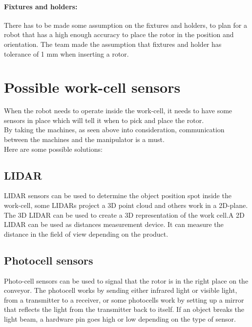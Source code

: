 \paragraph{Fixtures and holders:} There has to be made some assumption on the fixtures and holders, to plan for a robot that has a high enough accuracy to place the rotor in the position and orientation. The team made the assumption that fixtures and holder has tolerance of 1 mm when inserting a rotor. 

 
 \section{Possible work-cell sensors}\label{ref:PlacementS}
 
 When the robot needs to operate inside the work-cell, it needs to have some sensors in place which will tell it when to pick and place the rotor.\\
 By taking the machines, as seen above into consideration, communication between the machines and the manipulator is a must.\\
 Here are some possible solutions:\\

 
  \subsection{LIDAR} 
  LIDAR sensors can be used to determine the object position spot inside the work-cell, some LIDARs project a 3D point cloud and others work in a 2D-plane\cite{LIDAR}.\\
  The 3D LIDAR can be used to create a 3D representation of the work cell.A 2D LIDAR can be used as distances measurement device. It can measure the distance in the field of view depending on the product\cite{LIDAR}.\\

 
  \subsection{Photocell sensors} 
  Photo-cell sensors can be used to signal that the rotor is in the right place on the conveyor. The photocell works by sending either infrared light or visible light, from a transmitter to a receiver, or some photocells work by setting up a mirror that reflects the light from the transmitter back to itself. If an object breaks the light beam, a hardware pin goes high or low depending on the type of sensor\cite{SICKfo}.\\

